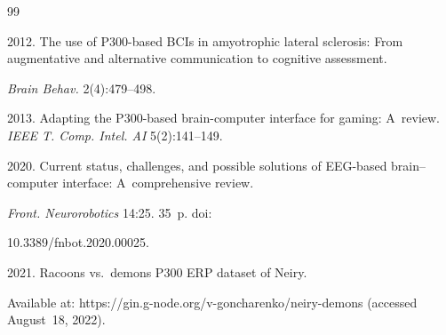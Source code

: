 


\renewcommand{\bibname}{\protect\rmfamily References}




{\small\frenchspacing

{ %


\begin{thebibliography}{99}



 2012. The use of P300-based BCIs in amyotrophic lateral sclerosis: From augmentative and alternative communication to cognitive assessment. 

 \textit{Brain Behav.} 2(4):479--498.





 2013. Adapting the P300-based brain-computer interface for gaming: A~review. \textit{IEEE T. Comp. Intel.  AI} 5(2):141--149.





 2020. Current status, challenges, and possible solutions of EEG-based brain--computer interface: A~comprehensive review. 

 \textit{Front. Neurorobotics} 14:25. 35~p. doi: 

10.3389\!/\!fnbot.2020.00025.




 2021. Racoons vs.\ demons P300 ERP dataset of Neiry. 

Available at: {\sf https://gin.g-node.org/v-goncharenko/neiry-demons} (accessed August~18, 2022).





\end{thebibliography}}}
